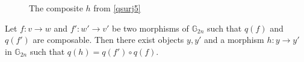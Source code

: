 {\begin{figure}[ht]
\begin{eq*}
 \end{eq*}
\caption{The composite $h$ from \cref{qsurj5} }
\label{composite}
\end{figure}
\clearpage
}

\begin{prop}\label{qsurj5} Let $f: v \to w$ and $f' : w' \to v'$ be two morphisms of $\mathbb{G}_{2n}$ such that $q(f)$ and $q(f')$ are composable. Then there exist objects $y, y'$ and a morphism $h: y \to y'$ in $\mathbb{G}_{2n}$ such that $q(h) = q(f') \circ q(f)$.
\end{prop}
